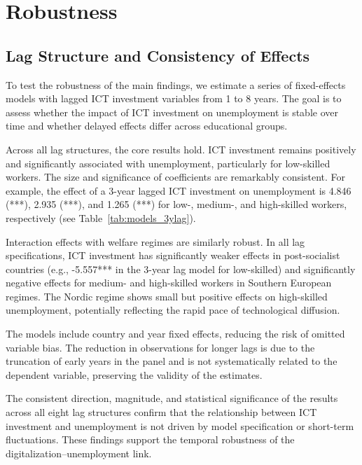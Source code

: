 
\section{Robustness}

\subsection{Lag Structure and Consistency of Effects}

To test the robustness of the main findings, we estimate a series of fixed-effects models with lagged 
ICT investment variables from 1 to 8 years. The goal is to assess whether the impact of ICT 
investment on unemployment is stable over time and whether delayed effects differ across educational 
groups.

Across all lag structures, the core results hold. ICT investment remains positively and 
significantly associated with unemployment, particularly for low-skilled workers. The size and 
significance of coefficients are remarkably consistent. For example, the effect of a 3-year lagged 
ICT investment on unemployment is 4.846 (***), 2.935 (***), and 1.265 (***) for low-, medium-, and 
high-skilled workers, respectively (see Table~\ref{tab:models_3ylag}).

Interaction effects with welfare regimes are similarly robust. In all lag specifications, ICT 
investment has significantly weaker effects in post-socialist countries (e.g., -5.557*** in the 
3-year lag model for low-skilled) and significantly negative effects for medium- and high-skilled 
workers in Southern European regimes. The Nordic regime shows small but positive effects on 
high-skilled unemployment, potentially reflecting the rapid pace of technological diffusion.

The models include country and year fixed effects, reducing the risk of omitted variable bias. The 
reduction in observations for longer lags is due to the truncation of early years in the panel and 
is not systematically related to the dependent variable, preserving the validity of the estimates.

The consistent direction, magnitude, and statistical significance of the results across all eight lag 
structures confirm that the relationship between ICT investment and unemployment is not driven by 
model specification or short-term fluctuations. These findings support the temporal robustness of the 
digitalization–unemployment link.

